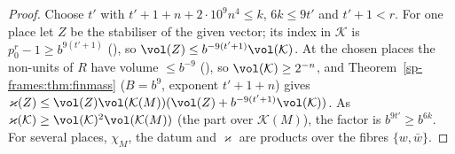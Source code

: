\begin{proof}
Choose $t'$ with $t'+1+n+2\cdot10^9n^4\le k$, $6k\le9t'$ and $t'+1<r$. For one place let $Z$ be the stabiliser of the given vector; its index
in $\mathcal K$ is $p_0^r-1\ge b^{9(t'+1)}$ (), so
$\vol(Z)\le b^{-9(t'+1)}\vol(\mathcal K)$. At the chosen places the non-units of $R$ have volume
$\le b^{-9}$ (), so $\vol(\mathcal K)\ge2^{-n}$, and Theorem~\ref{sp-frames:thm:finmass}
($B=b^9$, exponent $t'+1+n$) gives $\varkappa(Z)\le\vol(Z)\vol(\mathcal K(M))(\vol(Z)+b^{-9(t'+1)}\vol(\mathcal K))$.
As $\varkappa(\mathcal K)\ge\vol(\mathcal K)^2\vol(\mathcal K(M))$ (the part over $\mathcal K(M)$),
the factor is $b^{9t'}\ge b^{6k}$. For several places, $\chi_M$, the datum and $\varkappa$
are products over the fibres $\{w,\bar w\}$.
\end{proof}
